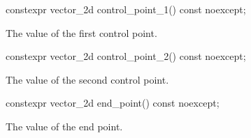 \begin{itemdecl}
constexpr vector_2d control_point_1() const noexcept;
\end{itemdecl}
\begin{itemdescr}
\pnum
\returns
The value of the first control point.
\end{itemdescr}

\begin{itemdecl}
constexpr vector_2d control_point_2() const noexcept;
\end{itemdecl}
\begin{itemdescr}
\pnum
\returns
The value of the second control point.
\end{itemdescr}

\begin{itemdecl}
constexpr vector_2d end_point() const noexcept;
\end{itemdecl}
\begin{itemdescr}
\pnum
\returns
The value of the end point.
\end{itemdescr}
